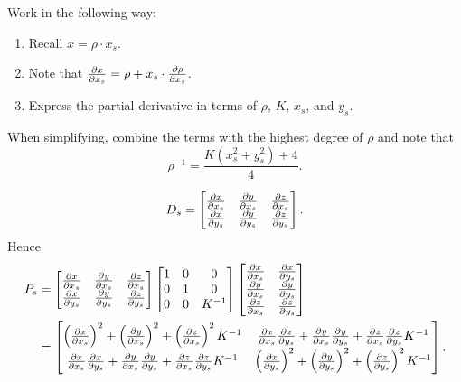 \documentclass[hints,handout,12pt,noauthor,nooutcomes]{ximera}
\begin{document}
\begin{problem}
  \begin{hint}
  Work in the following way:
  \begin{enumerate}
  \item Recall $x = \rho\cdot x_s$.
  \item Note that $\pp[x]{x_s} = \rho + x_s \cdot \pp[\rho]{x_s}$.
  \item Express the partial derivative in terms of $\rho$, $K$, $x_s$,
      and $y_s$.
  \end{enumerate}
  \end{hint}


  \begin{hint}
  When simplifying, combine the terms with the highest degree of $\rho$
  and note that
  \[
  \rho^{-1} = \frac{K\left(x_s^2 + y_s^2\right)+4}{4}.
  \]
\end{hint}


\begin{freeResponse}
  \[
  D_s =
  \begin{bmatrix}
    \pp[x]{x_s} & \pp[y]{x_s} & \pp[z]{x_s} \\
    \pp[x]{y_s}   & \pp[y]{y_s}   & \pp[z]{y_s}
  \end{bmatrix}.
  \]
  Hence
    \begin{align*}
      P_s &=
      \begin{bmatrix}
        \pp[x]{x_s} & \pp[y]{x_s} & \pp[z]{x_s} \\
        \pp[x]{y_s} & \pp[y]{y_s} & \pp[z]{y_s}
      \end{bmatrix}
      \begin{bmatrix}
        1 & 0 & 0\\
        0 & 1 & 0\\
        0 & 0 & K^{-1}
      \end{bmatrix}
      \begin{bmatrix}
        \pp[x]{x_s} & \pp[x]{y_s}\\ 
        \pp[y]{x_s} & \pp[y]{y_s}\\
        \pp[z]{x_s} & \pp[z]{y_s}
      \end{bmatrix}\\
      &=
      \begin{bmatrix}
        \left(\pp[x]{x_s}\right)^2 + \left(\pp[y]{x_s}\right)^2 + \left(\pp[z]{x_s}\right)^2K^{-1} & \pp[x]{x_s}\pp[x]{y_s} + \pp[y]{x_s}\pp[y]{y_s} + \pp[z]{x_s}\pp[z]{y_s} K^{-1}\\
        \pp[x]{x_s}\pp[x]{y_s} + \pp[y]{x_s}\pp[y]{y_s} + \pp[z]{x_s}\pp[z]{y_s} K^{-1}       & \left(\pp[x]{y_s}\right)^2 + \left(\pp[y]{y_s}\right)^2 + \left(\pp[z]{y_s}\right)^2K^{-1}
      \end{bmatrix}.
    \end{align*}



\end{freeResponse}
\end{problem}
\end{document}
